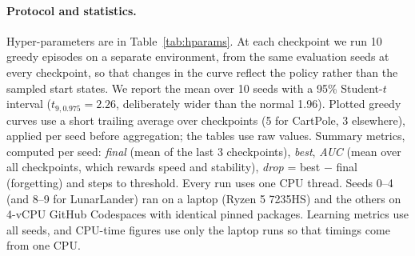 \begin{table}[t]
\centering\small
\caption{Hyper-parameters. Only the switch named in each configuration changes.}
\label{tab:hparams}
\end{table}

\paragraph{Protocol and statistics.} Hyper-parameters are in Table~\ref{tab:hparams}. At each checkpoint
we run 10 greedy episodes on a separate environment, from the same evaluation seeds at every checkpoint,
so that changes in the curve reflect the policy rather than the sampled start states. We report the
mean over 10 seeds with a 95\% Student-$t$ interval ($t_{9,0.975}=2.26$, deliberately wider than the
normal 1.96). Plotted greedy curves use a short trailing average over checkpoints (5 for CartPole, 3
elsewhere), applied per seed before aggregation; the tables use raw values. Summary metrics, computed
per seed: \emph{final} (mean of the last 3 checkpoints), \emph{best}, \emph{AUC} (mean over all
checkpoints, which rewards speed and stability), \emph{drop} = best $-$ final (forgetting) and steps to
threshold. Every run uses one CPU thread. Seeds 0--4 (and 8--9 for LunarLander) ran on a laptop
(Ryzen 5 7235HS) and the others on 4-vCPU GitHub Codespaces with identical pinned packages. Learning
metrics use all seeds, and CPU-time figures use only the laptop runs so that timings come from one CPU.

